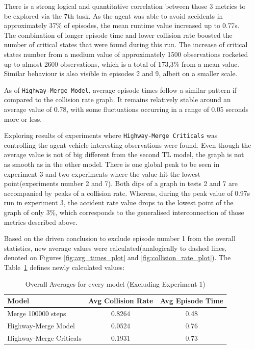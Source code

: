 There is a strong logical and quantitative correlation between those 3 metrics to be explored via the 7th task. As the agent was able to avoid accidents in approximately 37\% of episodes, the mean runtime value increased up to 0.77s. The combination of longer episode time and lower collision rate boosted the number of critical states that were found during this run. The increase of critical states number from a medium value of approximately 1500 observations rocketed up to almost 2600 observations, which is a total of 173,3\% from a mean value. Similar behaviour is also visible in episodes 2 and 9, albeit on a smaller scale.

As of \texttt{Highway-Merge Model}, average episode times follow a similar pattern if compared to the collision rate graph. It remains relatively stable around an average value of 0.78, with some fluctuations occurring in a range of 0.05 seconds more or less.

Exploring results of experiments where \texttt{Highway-Merge Criticals} was controlling the agent vehicle interesting observations were found. Even though the average value is not of big different from the second TL model, the graph is not as smooth as in the other model. There is one global peak to be seen in experiment 3 and two experiments where the value hit the lowest point(experiments number 2 and 7). Both dips of a graph in tests 2 and 7 are accompanied by peaks of a collision rate. Whereas, during the peak value of 0.97s run in experiment 3, the accident rate value drops to the lowest point of the graph of only 3\%, which corresponds to the generalised interconnection of those metrics described above.

Based on the driven conclusion to exclude episode number 1 from the overall statistics, new average values were calculated(analogically to dashed lines, denoted on Figures \ref{fig:avg_times_plot} and  \ref{fig:collision_rate_plot}). The Table~\ref{tab:overall_averages} defines newly calculated values:

\begin{table}[ht]
    \centering
    \renewcommand{\arraystretch}{1.4}
    \setlength{\tabcolsep}{12pt}
    \caption{Overall Averages for every model (Excluding Experiment 1)}
    \begin{tabular}{lcc}
    \hline
    \textbf{Model} & \textbf{Avg Collision Rate} & \textbf{Avg Episode Time} \\ \hline
 Merge 100000 steps & 0.8264 & 0.48 \\ \hline
 Highway-Merge Model     & 0.0524 & 0.76 \\ \hline
 Highway-Merge Criticals & 0.1931 & 0.73 \\ \hline
    \end{tabular}
    \label{tab:overall_averages}
\end{table}

